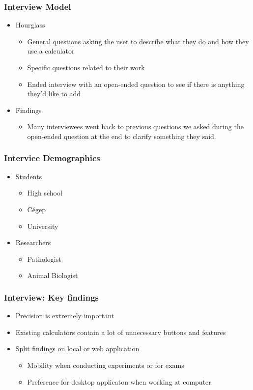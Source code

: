 \documentclass{beamer}
\begin{document}
  \begin{frame}
  \frametitle{Interview Model}
  \begin{itemize}
   \item Hourglass
    \begin{itemize}
     \item General questions asking the user to describe what they do and how they use a calculator
     \item Specific questions related to their work
     \item Ended interview with an open-ended question to see if there is anything they'd like to add
    \end{itemize}
   \item Findings
    \begin{itemize}
     \item Many interviewees went back to previous questions we asked during the open-ended question at the end to clarify something they said.
    \end{itemize}
  \end{itemize}
  \end{frame}


  \begin{frame}
  \frametitle{Interviee Demographics}
  \begin{itemize}
   \item Students
    \begin{itemize}
     \item High school
     \item Cégep
     \item University
    \end{itemize}
   \item Researchers
  \begin{itemize}
   \item Pathologist
      \item Animal Biologist
    \end{itemize}
  \end{itemize}
  \end{frame}
  
  
  \begin{frame}
  \frametitle{Interview: Key findings}
  \begin{itemize}
   \item Precision is extremely important
   \item Existing calculators contain a lot of unnecessary buttons and features
   \item Split findings on local or web application
    \begin{itemize}
     \item Mobility when conducting experiments or for exams
     \item Preference for desktop applicaton when working at computer
    \end{itemize}
  \end{itemize}
  \end{frame}
  
\end{document}
